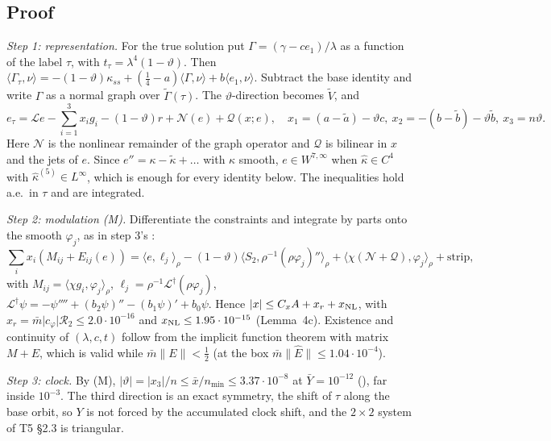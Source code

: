 \documentclass[11pt]{article}
\theoremstyle{definition}
\theoremstyle{remark}
\newcommand{\fn}[1]{\texttt{\detokenize{#1}}}
\newcommand{\ip}[2]{\langle #1,#2\rangle}
\newcommand{\abs}[1]{\lvert #1\rvert}
\newcommand{\norm}[1]{\lVert #1\rVert}
\newcommand{\kt}{\tilde\kappa}
\newcommand{\Gt}{\tilde\Gamma}
\newcommand{\Yb}{\bar Y}
\newcommand{\cL}{\mathcal L}
\newcommand{\cN}{\mathcal N}
\newcommand{\cQ}{\mathcal Q}
\newcommand{\cR}{\mathcal R}
\begin{document}
\subsection{Proof}\label{ss:proofP2}
\emph{Step 1: representation.} For the true solution put $\Gamma=(\gamma-ce_1)/\lambda$ as a function of the label $\tau$, with $t_\tau=\lambda^4(1-\vartheta)$. Then $\ip{\Gamma_\tau}\nu=-(1-\vartheta)\kappa_{ss}+(\frac14-a)\ip\Gamma\nu+b\ip{e_1}\nu$. Subtract the base identity and write $\Gamma$ as a normal graph over $\Gt(\tau)$. The $\vartheta$-direction becomes $\tilde V$, and
\[
e_\tau=\cL e-\sum_{i=1}^3x_ig_i-(1-\vartheta)r+\cN(e)+\cQ(x;e),\quad x_1=(a-\tilde a)-\vartheta c,\ x_2=-(b-\tilde b)-\vartheta\tilde b,\ x_3=n\vartheta .
\]
Here $\cN$ is the nonlinear remainder of the graph operator and $\cQ$ is bilinear in $x$ and the jets of $e$. Since $e''=\kappa-\kt+\dots$ with $\kappa$ smooth, $e\in W^{7,\infty}$ when $\hat\kappa\in C^4$ with $\hat\kappa^{(5)}\in L^\infty$, which is enough for every identity below. The inequalities hold a.e.\ in $\tau$ and are integrated.

\emph{Step 2: modulation (M).} Differentiate the constraints and integrate by parts onto the smooth $\varphi_j$, as in step 3's \fn{MOD_IBP}:
\[
\sum_ix_i(M_{ij}+E_{ij}(e))=\ip e{\ell_j}_\rho-(1-\vartheta)\ip{S_2}{\rho^{-1}(\rho\varphi_j)''}_\rho+\ip{\chi(\cN+\cQ)}{\varphi_j}_\rho+\text{strip},
\]
with $M_{ij}=\ip{\chi g_i}{\varphi_j}_\rho$, $\ell_j=\rho^{-1}\cL^\dagger(\rho\varphi_j)$, $\cL^\dagger\psi=-\psi''''+(b_2\psi)''-(b_1\psi)'+b_0\psi$. Hence $\abs x\le C_xA+x_r+x_{\rm NL}$, with $x_r=\bar m\abs{c_\varphi}\cR_2\le2.0\cdot10^{-16}$ and $x_{\rm NL}\le1.95\cdot10^{-15}$ (Lemma~4c). Existence and continuity of $(\lambda,c,t)$ follow from the implicit function theorem with matrix $M+E$, which is valid while $\bar m\norm{E}<\frac12$ (at the box $\bar m\norm{\hat E}\le1.04\cdot10^{-4}$).

\emph{Step 3: clock.} By (M), $\abs\vartheta=\abs{x_3}/n\le\bar x/n_{\min}\le3.37\cdot10^{-8}$ at $\Yb=10^{-12}$ (\fn{t1clock.json}), far inside $10^{-3}$. The third direction is an exact symmetry, the shift of $\tau$ along the base orbit, so $Y$ is not forced by the accumulated clock shift, and the $2\times2$ system of T5 \S2.3 is triangular.
\end{document}
